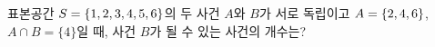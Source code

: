 표본공간 $S=\{1{,}\mkern3mu\mathopen{}2{,}\mkern3mu\mathopen{}3{,}\mkern3mu\mathopen{}4{,}\mkern3mu\mathopen{}5{,}\mkern3mu\mathopen{}6\}$의 두 사건 $A$와 $B$가 서로 독립이고 $A=\{2{,}\mkern3mu\mathopen{}4{,}\mkern3mu\mathopen{}6\}$, $A\cap B=\{4\}$일 때, 사건 $B$가 될 수 있는 사건의 개수는?

